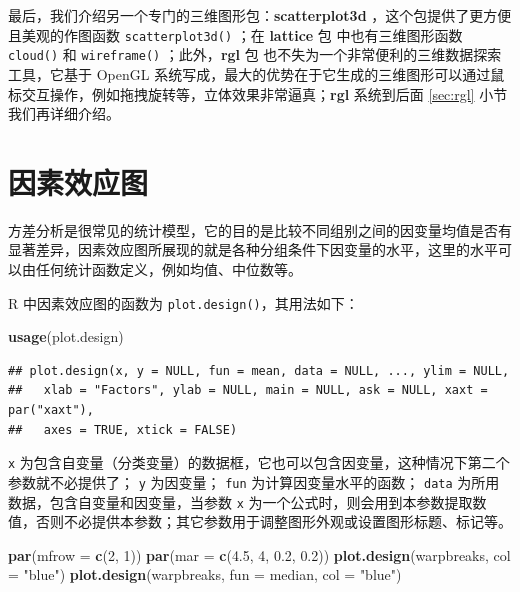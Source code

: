 \documentclass[
  b5paper,
  UTF8,twoside]{book}
\newenvironment{Shaded}{\begin{snugshade}}{\end{snugshade}}
\newcommand{\AttributeTok}[1]{\textcolor[rgb]{0.13,0.29,0.53}{#1}}
\newcommand{\DecValTok}[1]{\textcolor[rgb]{0.00,0.00,0.81}{#1}}
\newcommand{\FloatTok}[1]{\textcolor[rgb]{0.00,0.00,0.81}{#1}}
\newcommand{\FunctionTok}[1]{\textcolor[rgb]{0.13,0.29,0.53}{\textbf{#1}}}
\newcommand{\NormalTok}[1]{#1}
\newcommand{\StringTok}[1]{\textcolor[rgb]{0.31,0.60,0.02}{#1}}
\begin{document}
最后，我们介绍另一个专门的三维图形包：\textbf{scatterplot3d}
\citep{Ligges03}，这个包提供了更方便且美观的作图函数 \texttt{scatterplot3d()} ；在 \textbf{lattice} 包 \citep{Sarkar08} 中也有三维图形函数 \texttt{cloud()} 和 \texttt{wireframe()} ；此外，\textbf{rgl} 包 \citep{rgl} 也不失为一个非常便利的三维数据探索工具，它基于 OpenGL 系统写成，最大的优势在于它生成的三维图形可以通过鼠标交互操作，例如拖拽旋转等，立体效果非常逼真；\textbf{rgl} 系统到后面 \ref{sec:rgl} 小节我们再详细介绍。

\section{因素效应图}\label{plot-design}

方差分析是很常见的统计模型，它的目的是比较不同组别之间的因变量均值是否有显著差异，因素效应图所展现的就是各种分组条件下因变量的水平，这里的水平可以由任何统计函数定义，例如均值、中位数等。

R 中因素效应图的函数为 \texttt{plot.design()}，其用法如下：

\begin{Shaded}
\begin{Highlighting}[]
\FunctionTok{usage}\NormalTok{(plot.design)}
\end{Highlighting}
\end{Shaded}

\begin{verbatim}
## plot.design(x, y = NULL, fun = mean, data = NULL, ..., ylim = NULL,
##   xlab = "Factors", ylab = NULL, main = NULL, ask = NULL, xaxt = par("xaxt"),
##   axes = TRUE, xtick = FALSE)
\end{verbatim}

\texttt{x} 为包含自变量（分类变量）的数据框，它也可以包含因变量，这种情况下第二个参数就不必提供了； \texttt{y} 为因变量； \texttt{fun} 为计算因变量水平的函数； \texttt{data} 为所用数据，包含自变量和因变量，当参数 \texttt{x} 为一个公式时，则会用到本参数提取数值，否则不必提供本参数；其它参数用于调整图形外观或设置图形标题、标记等。





\begin{Shaded}
\begin{Highlighting}[]
\FunctionTok{par}\NormalTok{(}\AttributeTok{mfrow =} \FunctionTok{c}\NormalTok{(}\DecValTok{2}\NormalTok{, }\DecValTok{1}\NormalTok{))}
\FunctionTok{par}\NormalTok{(}\AttributeTok{mar =} \FunctionTok{c}\NormalTok{(}\FloatTok{4.5}\NormalTok{, }\DecValTok{4}\NormalTok{, }\FloatTok{0.2}\NormalTok{, }\FloatTok{0.2}\NormalTok{))}
\FunctionTok{plot.design}\NormalTok{(warpbreaks, }\AttributeTok{col =} \StringTok{"blue"}\NormalTok{)}
\FunctionTok{plot.design}\NormalTok{(warpbreaks, }\AttributeTok{fun =}\NormalTok{ median, }\AttributeTok{col =} \StringTok{"blue"}\NormalTok{)}
\end{Highlighting}
\end{Shaded}
\end{document}
